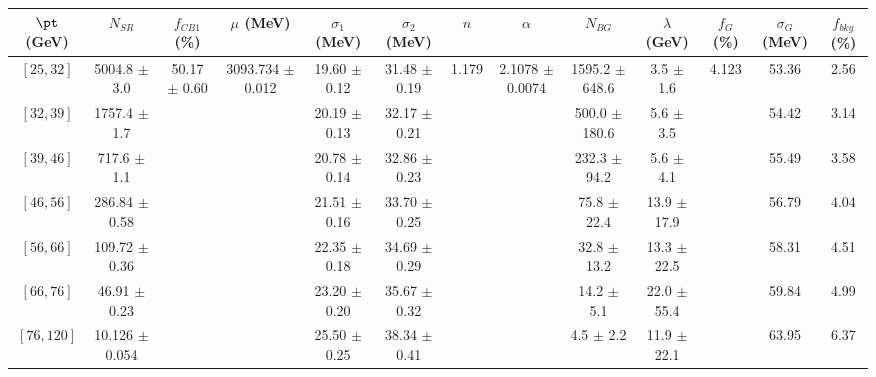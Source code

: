 \begin{tabular}{c||c|c|c|c|c|c|c|c|c|c|c||c}
$\pt$ (GeV) & $N_{SR}$ & $f_{CB1}$ (\%) & $\mu$ (MeV) & $\sigma_1$ (MeV) & $\sigma_2$ (MeV) & $n$ & $\alpha$ & $N_{BG}$ & $\lambda$ (GeV) & $f_G$ (\%) & $\sigma_G$ (MeV) & $f_{bkg}$ (\%) \\
\hline
$[25, 32]$ & 5004.8 $\pm$ 3.0 & \multirow{7}{*}{50.17 $\pm$ 0.60} & \multirow{7}{*}{3093.734 $\pm$ 0.012} & 19.60 $\pm$ 0.12 & 31.48 $\pm$ 0.19 & \multirow{7}{*}{1.179} & \multirow{7}{*}{2.1078 $\pm$ 0.0074} & 1595.2 $\pm$ 648.6 & 3.5 $\pm$ 1.6 & \multirow{7}{*}{4.123} & 53.36 & 2.56\\
$[32, 39]$ & 1757.4 $\pm$ 1.7 &  &  & 20.19 $\pm$ 0.13 & 32.17 $\pm$ 0.21 &  &  & 500.0 $\pm$ 180.6 & 5.6 $\pm$ 3.5 &  & 54.42 & 3.14\\
$[39, 46]$ & 717.6 $\pm$ 1.1 &  &  & 20.78 $\pm$ 0.14 & 32.86 $\pm$ 0.23 &  &  & 232.3 $\pm$ 94.2 & 5.6 $\pm$ 4.1 &  & 55.49 & 3.58\\
$[46, 56]$ & 286.84 $\pm$ 0.58 &  &  & 21.51 $\pm$ 0.16 & 33.70 $\pm$ 0.25 &  &  & 75.8 $\pm$ 22.4 & 13.9 $\pm$ 17.9 &  & 56.79 & 4.04\\
$[56, 66]$ & 109.72 $\pm$ 0.36 &  &  & 22.35 $\pm$ 0.18 & 34.69 $\pm$ 0.29 &  &  & 32.8 $\pm$ 13.2 & 13.3 $\pm$ 22.5 &  & 58.31 & 4.51\\
$[66, 76]$ & 46.91 $\pm$ 0.23 &  &  & 23.20 $\pm$ 0.20 & 35.67 $\pm$ 0.32 &  &  & 14.2 $\pm$ 5.1 & 22.0 $\pm$ 55.4 &  & 59.84 & 4.99\\
$[76, 120]$ & 10.126 $\pm$ 0.054 &  &  & 25.50 $\pm$ 0.25 & 38.34 $\pm$ 0.41 &  &  & 4.5 $\pm$ 2.2 & 11.9 $\pm$ 22.1 &  & 63.95 & 6.37\\
\end{tabular}
